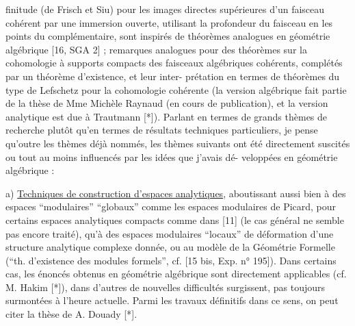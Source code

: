 
finitude (de Frisch et Siu) pour les images directes
supérieures d'un faisceau cohérent par une immersion
ouverte, utilisant la profondeur du faisceau en les
points du complémentaire, sont inspirés de théorèmes
analogues en géométrie algébrique [16, SGA 2] ; remarques
analogues pour des théorèmes sur la cohomologie à
supports compacts des faisceaux algébriques cohérents,
complétés par un théorème d'existence, et leur inter-%
prétation en termes de théorèmes du type de Lefschetz
pour la cohomologie cohérente (la version algébrique
fait partie de la thèse de Mme Michèle Raynaud (en cours
de publication), et la version analytique est due à
Trautmann [*]). Parlant en termes de grands thèmes de
recherche plutôt qu'en termes de résultats techniques
particuliers, je pense qu'outre les thèmes déjà nommés,
les thèmes suivants ont été directement suscités ou
tout au moins influencés par les idées que j'avais dé-%
veloppées en géométrie algébrique :

a) \uline{Techniques de construction d'espaces analytiques},
aboutissant aussi bien à des espaces ``modulaires''
``globaux'' comme les espaces modulaires de Picard, pour
certains espaces analytiques compacts comme dans [11]
(le cas général ne semble pas encore traité), qu'à des
espaces modulaires ``locaux'' de déformation d'une structure
analytique complexe donnée, ou au modèle de la Géométrie
Formelle (``th. d'existence des modules formels'',
cf. [15 bis, Exp. n° 195]). Dans certains cas, les
énoncés obtenus en géométrie algébrique sont directement
applicables (cf. M. Hakim [*]), dans d'autres de nouvelles
difficultés surgissent, pas toujours surmontées à
l'heure actuelle. Parmi les travaux définitifs dans
ce sens, on peut citer la thèse de A. Douady [*].

